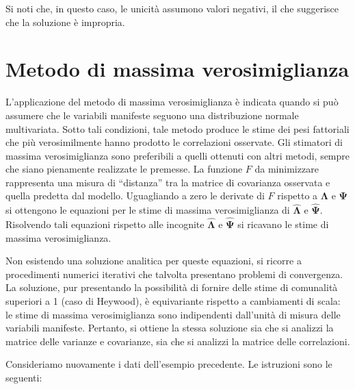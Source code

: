 \documentclass[
  11pt,
]{krantz}
\theoremstyle{definition}
\theoremstyle{definition}
\theoremstyle{definition}
\theoremstyle{definition}
\theoremstyle{remark}
\begin{document}
Si noti che, in questo caso, le unicità assumono valori negativi, il che suggerisce che la soluzione è impropria.

\hypertarget{metodo-di-massima-verosimiglianza}{%
\section{Metodo di massima verosimiglianza}\label{metodo-di-massima-verosimiglianza}}

L'applicazione del metodo di massima verosimiglianza è indicata quando si può assumere che le variabili manifeste seguono una distribuzione normale multivariata. Sotto tali condizioni, tale metodo produce le stime dei pesi fattoriali che più verosimilmente hanno prodotto le correlazioni osservate. Gli stimatori di massima verosimiglianza sono preferibili a quelli ottenuti con altri metodi, sempre che siano pienamente realizzate le premesse. La funzione \(F\) da minimizzare rappresenta una misura di ``distanza'' tra la matrice di covarianza osservata e quella predetta dal modello. Uguagliando a zero le derivate di \(F\) rispetto a \(\boldsymbol{\Lambda}\) e \(\boldsymbol{\Psi}\) si ottengono le equazioni per le stime di massima verosimiglianza di \(\hat{\boldsymbol{\Lambda}}\) e \(\hat{\boldsymbol{\Psi}}\). Risolvendo tali equazioni rispetto alle incognite \(\hat{\boldsymbol{\Lambda}}\) e \(\hat{\boldsymbol{\Psi}}\) si ricavano le stime di massima verosimiglianza.

Non esistendo una soluzione analitica per queste equazioni, si ricorre a procedimenti numerici iterativi che talvolta presentano problemi di convergenza. La soluzione, pur presentando la possibilità di fornire delle stime di comunalità superiori a 1 (caso di Heywood), è equivariante rispetto a cambiamenti di scala: le stime di massima verosimiglianza sono indipendenti dall'unità di misura delle variabili manifeste. Pertanto, si ottiene la stessa soluzione sia che si analizzi la matrice delle varianze e covarianze, sia che si analizzi la matrice delle correlazioni.

Consideriamo nuovamente i dati dell'esempio precedente. Le istruzioni sono le seguenti:
\end{document}
